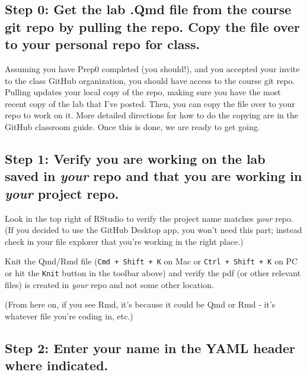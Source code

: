 \documentclass[
  letterpaper,
  DIV=11,
  numbers=noendperiod]{scrartcl}
\begin{document}
\hypertarget{step-0-get-the-lab-.qmd-file-from-the-course-git-repo-by-pulling-the-repo.-copy-the-file-over-to-your-personal-repo-for-class.}{%
\subsection{Step 0: Get the lab .Qmd file from the course git repo by
pulling the repo. Copy the file over to your personal repo for
class.}\label{step-0-get-the-lab-.qmd-file-from-the-course-git-repo-by-pulling-the-repo.-copy-the-file-over-to-your-personal-repo-for-class.}}

Assuming you have Prep0 completed (you should!), and you accepted your
invite to the class GitHub organization, you should have access to the
course git repo. Pulling updates your local copy of the repo, making
sure you have the most recent copy of the lab that I've posted. Then,
you can copy the file over to your repo to work on it. More detailed
directions for how to do the copying are in the GitHub classroom guide.
Once this is done, we are ready to get going.

\hypertarget{step-1-verify-you-are-working-on-the-lab-saved-in-your-repo-and-that-you-are-working-in-your-project-repo.}{%
\subsection{\texorpdfstring{Step 1: Verify you are working on the lab
saved in \emph{your} repo and that you are working in \emph{your}
project
repo.}{Step 1: Verify you are working on the lab saved in your repo and that you are working in your project repo.}}\label{step-1-verify-you-are-working-on-the-lab-saved-in-your-repo-and-that-you-are-working-in-your-project-repo.}}

Look in the top right of RStudio to verify the project name matches
\emph{your} repo. (If you decided to use the GitHub Desktop app, you
won't need this part; instead check in your file explorer that you're
working in the right place.)

Knit the Qmd/Rmd file (\texttt{Cmd\ +\ Shift\ +\ K} on Mac or
\texttt{Ctrl\ +\ Shift\ +\ K} on PC or hit the \texttt{Knit} button in
the toolbar above) and verify the pdf (or other relevant files) is
created in \emph{your} repo and not some other location.

(From here on, if you see Rmd, it's because it could be Qmd or Rmd -
it's whatever file you're coding in, etc.)

\hypertarget{step-2-enter-your-name-in-the-yaml-header-where-indicated.}{%
\subsection{Step 2: Enter your name in the YAML header where
indicated.}\label{step-2-enter-your-name-in-the-yaml-header-where-indicated.}}
\end{document}

